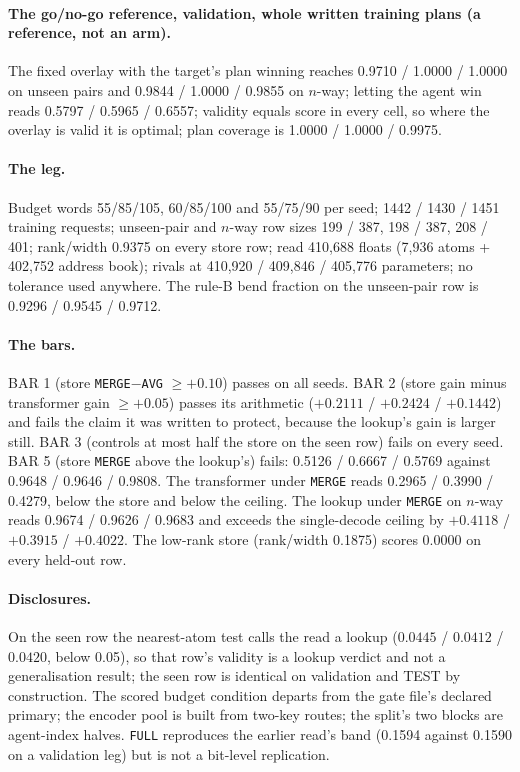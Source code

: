 \documentclass{article} %
\begin{document}
\paragraph{The go/no-go reference, validation, whole written training plans (a reference, not an
arm).} The fixed overlay with the target's plan winning reaches 0.9710 / 1.0000 / 1.0000 on unseen
pairs and 0.9844 / 1.0000 / 0.9855 on $n$-way; letting the agent win reads 0.5797 / 0.5965 / 0.6557;
validity equals score in every cell, so where the overlay is valid it is optimal; plan coverage is
1.0000 / 1.0000 / 0.9975. %

\paragraph{The leg.} Budget words 55/85/105, 60/85/100 and 55/75/90 per seed; 1442 / 1430 / 1451
training requests; unseen-pair and $n$-way row sizes 199 / 387, 198 / 387, 208 / 401; rank/width
0.9375 on every store row; read 410,688 floats (7,936 atoms + 402,752 address book); rivals at
410,920 / 409,846 / 405,776 parameters; no tolerance used anywhere. The rule-B bend fraction on the
unseen-pair row is 0.9296 / 0.9545 / 0.9712. %

\paragraph{The bars.} BAR 1 (store \texttt{MERGE}$-$\texttt{AVG} $\ge+0.10$) passes on all seeds.
BAR 2 (store gain minus transformer gain $\ge+0.05$) passes its arithmetic ($+0.2111$ / $+0.2424$
/ $+0.1442$) and fails the claim it was written to protect, because the lookup's gain is larger
still. BAR 3 (controls at most half the store on the seen row) fails on every seed. BAR 5 (store
\texttt{MERGE} above the lookup's) fails: 0.5126 / 0.6667 / 0.5769 against 0.9648 / 0.9646 /
0.9808. The transformer under \texttt{MERGE} reads 0.2965 / 0.3990 / 0.4279, below the store and
below the ceiling. The lookup under \texttt{MERGE} on $n$-way reads 0.9674 / 0.9626 / 0.9683 and
exceeds the single-decode ceiling by $+0.4118$ / $+0.3915$ / $+0.4022$. The low-rank store
(rank/width 0.1875) scores 0.0000 on every held-out row. %

\paragraph{Disclosures.} On the seen row the nearest-atom test calls the read a lookup
($0.0445$ / $0.0412$ / $0.0420$, below 0.05), so that row's validity is a lookup verdict and not a
generalisation result; the seen row is identical on validation and TEST by construction. The
scored budget condition departs from the gate file's declared primary; the encoder pool is built
from two-key routes; the split's two blocks are agent-index halves. \texttt{FULL} reproduces the
earlier read's band (0.1594 against 0.1590 on a validation leg) but is not a bit-level
replication. %
\end{document}
